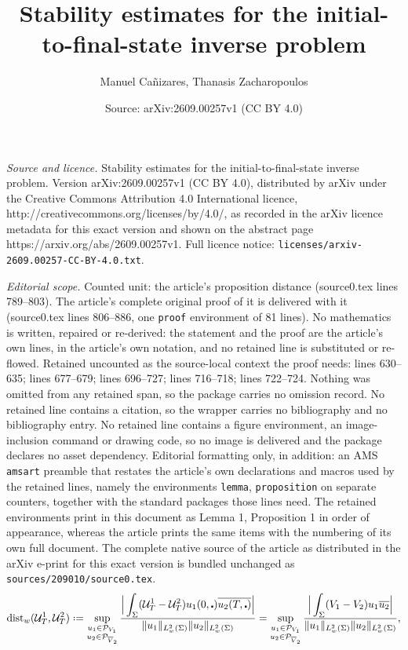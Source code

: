 \documentclass[10pt,a4paper]{amsart}
\title{Stability estimates for the initial-to-final-state inverse problem}
\author{Manuel Ca\~nizares, Thanasis Zacharopoulos}
\date{Source: arXiv:2609.00257v1 (CC BY 4.0)}
\def\cal{\mathcal}
\def\cd{\centerdot}
\newcommand*{\defeq}{\mathrel{\vcenter{\baselineskip0.5ex \lineskiplimit0pt
			\hbox{\scriptsize.}\hbox{\scriptsize.}}}%
	=}
\newcommand{\dist}{\mathrm{dist}}
\def\ovl{\overline}
\begin{document}
\maketitle

\noindent\emph{Source and licence.} Stability estimates for the initial-to-final-state inverse problem. Version arXiv:2609.00257v1 (CC BY 4.0), distributed by arXiv under the Creative Commons Attribution 4.0 International licence, http://creativecommons.org/licenses/by/4.0/, as recorded in the arXiv licence metadata for this exact version and shown on the abstract page https://arxiv.org/abs/2609.00257v1. Full licence notice: \texttt{licenses/arxiv-2609.00257-CC-BY-4.0.txt}.\par\smallskip

\noindent\textit{Editorial scope.} Counted unit: the article's proposition distance (source0.tex lines 789--803). The article's complete original proof of it is delivered with it (source0.tex lines 806--886, one \texttt{proof} environment of 81 lines). No mathematics is written, repaired or re-derived: the statement and the proof are the article's own lines, in the article's own notation, and no retained line is substituted or re-flowed.  Retained uncounted as the source-local context the proof needs: lines 630--635; lines 677--679; lines 696--727; lines 716--718; lines 722--724.  Nothing was omitted from any retained span, so the package carries no omission record.  No retained line contains a citation, so the wrapper carries no bibliography and no bibliography entry.  No retained line contains a figure environment, an image-inclusion command or drawing code, so no image is delivered and the package declares no asset dependency.  Editorial formatting only, in addition: an AMS \texttt{amsart} preamble that restates the article's own declarations and macros used by the retained lines, namely the environments \texttt{lemma}, \texttt{proposition} on separate counters, together with the standard packages those lines need.  The retained environments print in this document as Lemma 1, Proposition 1 in order of appearance, whereas the article prints the same items with the numbering of its own full document.  The complete native source of the article as distributed in the arXiv e-print for this exact version is bundled unchanged as \texttt{sources/209010/source0.tex}.
\begin{equation}\label{eq: distance}
\dist_w(\cal{U}_T^1, \cal{U}_T^2) \defeq
\sup_{\substack{u_1 \in \cal{P}_{V_1}\\ u_2 \in \cal{P}_{\overline{V}_2}}} \frac{\Big| \displaystyle \int_\Sigma (\cal{U}_T^1-\cal{U}_T^2) u_1(0, \cd) \ovl{u_2(T, \cd)}\Big|}{\|u_1\|_{L^2_w(\Sigma)} \| u_2\|_{L^2_w(\Sigma)}}
%
=\sup_{\substack{u_1 \in \cal{P}_{V_1}\\ u_2 \in \cal{P}_{\overline{V}_2}}} \frac{\Big| \displaystyle \int_\Sigma (V_1 - V_2) u_1 \ovl{u_2} \Big|}{\|u_1\|_{L^2_w(\Sigma)} \| u_2\|_{L^2_w(\Sigma)}},
\end{equation}
\end{document}
